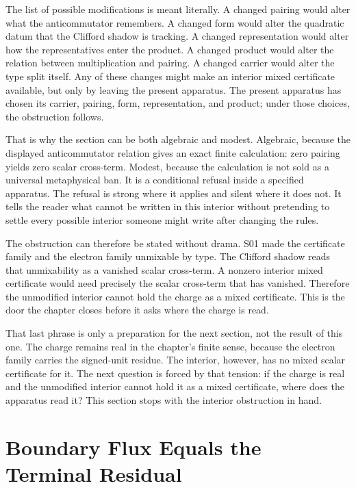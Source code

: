 The list of possible modifications is meant literally. A changed pairing would
alter what the anticommutator remembers. A changed form would alter the
quadratic datum that the Clifford shadow is tracking. A changed representation
would alter how the representatives enter the product. A changed product would
alter the relation between multiplication and pairing. A changed carrier would
alter the type split itself. Any of these changes might make an interior mixed
certificate available, but only by leaving the present apparatus. The present
apparatus has chosen its carrier, pairing, form, representation, and product;
under those choices, the obstruction follows.

That is why the section can be both algebraic and modest. Algebraic, because
the displayed anticommutator relation gives an exact finite calculation:
zero pairing yields zero scalar cross-term. Modest, because the calculation is
not sold as a universal metaphysical ban. It is a conditional refusal inside a
specified apparatus. The refusal is strong where it applies and silent where it
does not. It tells the reader what cannot be written in this interior without
pretending to settle every possible interior someone might write after changing
the rules.

The obstruction can therefore be stated without drama. S01 made the
certificate family and the electron family unmixable by type. The Clifford
shadow reads that unmixability as a vanished scalar cross-term. A nonzero
interior mixed certificate would need precisely the scalar cross-term that has
vanished. Therefore the unmodified interior cannot hold the charge as a mixed
certificate. This is the door the chapter closes before it asks where the
charge is read.

That last phrase is only a preparation for the next section, not the result of
this one. The charge remains real in the chapter's finite sense, because the
electron family carries the signed-unit residue. The interior, however, has no
mixed scalar certificate for it. The next question is forced by that tension:
if the charge is real and the unmodified interior cannot hold it as a mixed
certificate, where does the apparatus read it? This section stops with the
interior obstruction in hand.

\section{Boundary Flux Equals the Terminal Residual}

